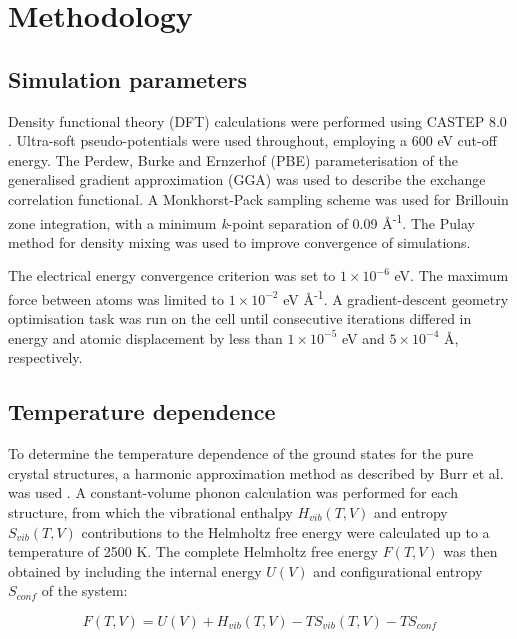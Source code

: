 \section{Methodology}
\subsection{Simulation parameters}

Density functional theory (DFT) calculations were performed using CASTEP 8.0 \cite{Clark2005}. Ultra-soft pseudo-potentials were used throughout, employing a 600 eV cut-off energy. The Perdew, Burke and Ernzerhof (PBE) \cite{Perdew1996} parameterisation of the generalised gradient approximation (GGA) was used to describe the exchange correlation functional. A Monkhorst-Pack sampling scheme \cite{Monkhorst1976} was used for Brillouin zone integration, with a minimum \emph{k}-point separation of 0.09 \r{A}\textsuperscript{-1}. The Pulay method for density mixing \cite{Pulay1980} was used to improve convergence of simulations. 

The electrical energy convergence criterion was set to $1\times10^{-6} $ eV. The maximum force between atoms was limited to $1\times10^{-2}$ eV \r{A}\textsuperscript{-1}. A gradient-descent geometry optimisation task was run on the cell until consecutive iterations differed in energy and atomic displacement by less than $1\times10^{-5}$ eV and $5\times10^{-4}$ \r{A}, respectively. 


\subsection{Temperature dependence}

To determine the temperature dependence of the ground states for the pure crystal structures, a harmonic approximation method as described by Burr et al. was used \cite{burr2015crystal,jackson2016resolving}. A constant-volume phonon calculation was performed for each structure, from which the vibrational enthalpy $H_{vib}(T, V)$ and entropy $S_{vib}(T, V)$ contributions to the Helmholtz free energy were calculated up to a temperature of 2500 K. The complete Helmholtz free energy $F(T, V)$ was then obtained by including the internal energy $U(V)$ and configurational entropy $S_{conf}$ of the system:

\begin{equation} \label{helmholtz_equation}
F(T, V) = U(V) + H_{vib}(T, V) - TS_{vib}(T, V) - TS_{conf}
\end{equation}

